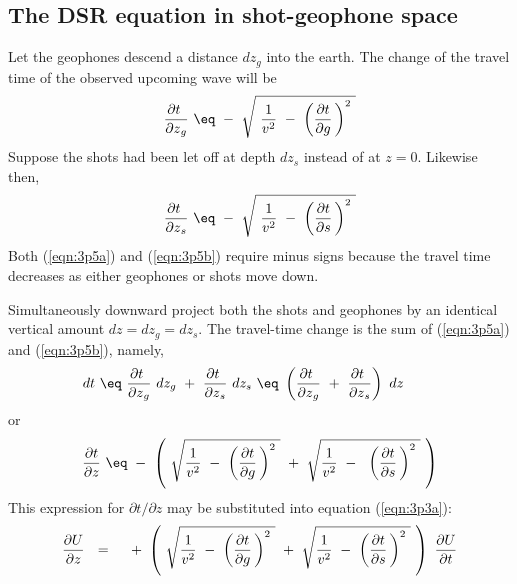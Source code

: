 \subsection{The DSR equation in shot-geophone space}
\par
Let the geophones descend a distance  $ dz_g $  into the earth.
The change of the travel time of the observed upcoming wave will be  
\begin{equation}
{{\partial t}\   \over {\partial z}_g} \  \eq \ 
- \   \sqrt{\  {1 \over  v^2 } \ -\ 
\left( {\partial t  \over \partial g} \, \right)^2 \  }
\label{eqn:3p5a}
\end{equation}
Suppose the shots had been let off at depth  $ dz_s $  instead of at  $z = 0$.
Likewise then,
\begin{equation}
{{\partial t}\   \over {\partial z}_s} \  \eq \ 
- \  \sqrt{\  {1 \over  v^2 } \ -\ 
\left( {\partial t  \over \partial s} \, \right)^2 \  }
\label{eqn:3p5b}
\end{equation}
Both (\ref{eqn:3p5a}) and (\ref{eqn:3p5b})
require minus signs because the travel time
decreases as either geophones or shots move down.
\par
Simultaneously downward project both the shots and
geophones by an identical vertical amount  $dz=dz_g = dz_s$.
The travel-time change is the sum
of (\ref{eqn:3p5a}) and (\ref{eqn:3p5b}), namely,
\begin{equation}
dt \  \eq \ 
{{\partial t}\ \over {\partial z}_g } \  dz_g \ +\  
{ {\partial t} \   \over {\partial z}_s } \  dz_s
\  \eq \ 
\left( {{\partial t}\   \over  {\partial z}_g } \ +\  { {\partial t} \ 
\over  {\partial z}_s} \right) \  dz \ \ \ \ \ \ \ 
\label{eqn:3p6}
\end{equation}
or
\begin{equation}
{\partial t  \over \partial z}  \  \eq \ 
- \  \left( \  \sqrt{ {1 \over  v^2 } \ -\ 
\left( {\partial t  \over \partial g} \, \right)^2 \  } \ +\ 
\sqrt{ {1 \over  v^2 } \ -\ 
\  {\left( {\partial t  \over \partial s} \, \right)^2} 
\  } \  \right)
\label{eqn:3p7}
\end{equation}
This expression for  ${\partial t}/{\partial z} $  may be substituted
into equation (\ref{eqn:3p3a}):
\begin{equation}
{ \partial U   \over  \partial z } \ \  =\ \ \ \  + \  \left(\   \sqrt{
{1 \over  v^2 } \ -\  \left( {\partial t  \over \partial g} \, \right)^2
\  } \ +\  \sqrt{ {1
\over  v^2 } \ -\  \left( {\partial t  \over \partial s} \, \right)^2 \ 
} \  \right) \  { \partial U   \over  \partial t }
\label{eqn:3p8}
\end{equation}
